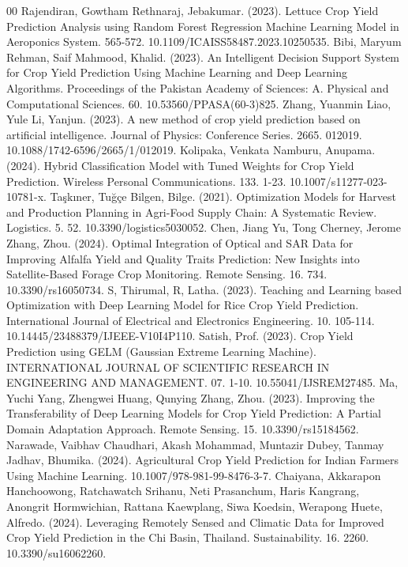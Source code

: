 \documentclass[conference]{IEEEtran}
\begin{document}
\begin{thebibliography}{00}
 Rajendiran, Gowtham Rethnaraj, Jebakumar. (2023). Lettuce Crop Yield Prediction Analysis using Random Forest Regression Machine Learning Model in Aeroponics System. 565-572. 10.1109/ICAISS58487.2023.10250535. 
 Bibi, Maryum Rehman, Saif Mahmood, Khalid. (2023). An Intelligent Decision Support System for Crop Yield Prediction Using Machine Learning and Deep Learning Algorithms. Proceedings of the Pakistan Academy of Sciences: A. Physical and Computational Sciences. 60. 10.53560/PPASA(60-3)825. 
 Zhang, Yuanmin Liao, Yule Li, Yanjun. (2023). A new method of crop yield prediction based on artificial intelligence. Journal of Physics: Conference Series. 2665. 012019. 10.1088/1742-6596/2665/1/012019. 
 Kolipaka, Venkata Namburu, Anupama. (2024). Hybrid Classification Model with Tuned Weights for Crop Yield Prediction. Wireless Personal Communications. 133. 1-23. 10.1007/s11277-023-10781-x. 
 Taşkıner, Tuğçe Bilgen, Bilge. (2021). Optimization Models for Harvest and Production Planning in Agri-Food Supply Chain: A Systematic Review. Logistics. 5. 52. 10.3390/logistics5030052. 
 Chen, Jiang Yu, Tong Cherney, Jerome Zhang, Zhou. (2024). Optimal Integration of Optical and SAR Data for Improving Alfalfa Yield and Quality Traits Prediction: New Insights into Satellite-Based Forage Crop Monitoring. Remote Sensing. 16. 734. 10.3390/rs16050734. 
 S, Thirumal, R, Latha. (2023). Teaching and Learning based Optimization with Deep Learning Model for Rice Crop Yield Prediction. International Journal of Electrical and Electronics Engineering. 10. 105-114. 10.14445/23488379/IJEEE-V10I4P110. 
 Satish, Prof. (2023). Crop Yield Prediction using GELM (Gaussian Extreme Learning Machine). INTERNATIONAL JOURNAL OF SCIENTIFIC RESEARCH IN ENGINEERING AND MANAGEMENT. 07. 1-10. 10.55041/IJSREM27485. 
 Ma, Yuchi Yang, Zhengwei Huang, Qunying Zhang, Zhou. (2023). Improving the Transferability of Deep Learning Models for Crop Yield Prediction: A Partial Domain Adaptation Approach. Remote Sensing. 15. 10.3390/rs15184562. 
 Narawade, Vaibhav Chaudhari, Akash Mohammad, Muntazir Dubey, Tanmay Jadhav, Bhumika. (2024). Agricultural Crop Yield Prediction for Indian Farmers Using Machine Learning. 10.1007/978-981-99-8476-3-7. 
 Chaiyana, Akkarapon Hanchoowong, Ratchawatch Srihanu, Neti Prasanchum, Haris Kangrang, Anongrit Hormwichian, Rattana Kaewplang, Siwa Koedsin, Werapong Huete, Alfredo. (2024). Leveraging Remotely Sensed and Climatic Data for Improved Crop Yield Prediction in the Chi Basin, Thailand. Sustainability. 16. 2260. 10.3390/su16062260. 

\end{thebibliography}
\end{document}
